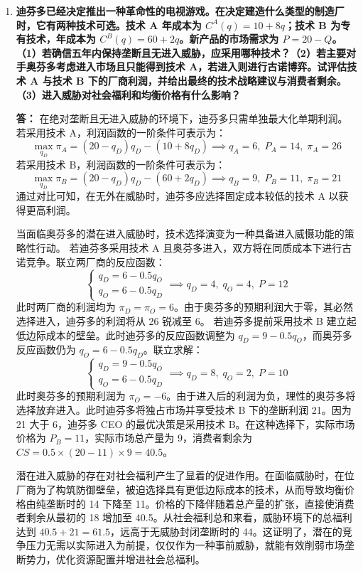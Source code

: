 \begin{enumerate}[label=\textbf{\arabic*.}, leftmargin=*]
		\item \textbf{迪芬多已经决定推出一种革命性的电视游戏。在决定建造什么类型的制造厂时，它有两种技术可选。技术 A 年成本为 $C^A(q) = 10 + 8q$；技术 B 为专有技术，年成本为 $C^B(q) = 60 + 2q$。新产品的市场需求为 $P = 20 - Q$。（1）若确信五年内保持垄断且无进入威胁，应采用哪种技术？（2）若主要对手奥芬多考虑进入市场且只能得到技术 A，若进入则进行古诺博弈。试评估技术 A 与技术 B 下的厂商利润，并给出最终的技术战略建议与消费者剩余。（3）进入威胁对社会福利和均衡价格有什么影响？}
		
		\textbf{答：}
		在绝对垄断且无进入威胁的环境下，迪芬多只需单独最大化单期利润。若采用技术 A，利润函数的一阶条件可表示为：
		\[
		\max_{q_D} \pi_A = (20 - q_D)q_D - (10 + 8q_D) \implies q_A = 6, \; P_A = 14, \; \pi_A = 26
		\]
		若采用技术 B，利润函数的一阶条件可表示为：
		\[
		\max_{q_D} \pi_B = (20 - q_D)q_D - (60 + 2q_D) \implies q_B = 9, \; P_B = 11, \; \pi_B = 21
		\]
		通过对比可知，在无外在威胁时，迪芬多应选择固定成本较低的技术 A 以获得更高利润。
		
		当面临奥芬多的潜在进入威胁时，技术选择演变为一种具备进入威慑功能的策略性行动。
		若迪芬多采用技术 A 且奥芬多进入，双方将在同质成本下进行古诺竞争。联立两厂商的反应函数：
		\[
		\begin{cases}
			q_D = 6 - 0.5q_O \\
			q_O = 6 - 0.5q_D
		\end{cases}
		\implies q_D = 4, \; q_O = 4, \; P = 12
		\]
		此时两厂商的利润均为 $\pi_D = \pi_O = 6$。由于奥芬多的预期利润大于零，其必然选择进入，迪芬多的利润将从 26 锐减至 6。
		若迪芬多提前采用技术 B 建立起低边际成本的壁垒。此时迪芬多的反应函数调整为 $q_D = 9 - 0.5q_O$，而奥芬多反应函数仍为 $q_O = 6 - 0.5q_D$。联立求解：
		\[
		\begin{cases}
			q_D = 9 - 0.5q_O \\
			q_O = 6 - 0.5q_D
		\end{cases}
		\implies q_D = 8, \; q_O = 2, \; P = 10
		\]
		此时奥芬多的预期利润为 $\pi_O = -6$。由于进入后的利润为负，理性的奥芬多将选择放弃进入。此时迪芬多将独占市场并享受技术 B 下的垄断利润 21。因为 21 大于 6，迪芬多 CEO 的最优决策是采用技术 B。在这种选择下，实际市场价格为 $P_B = 11$，实际市场总产量为 9，消费者剩余为 $CS = 0.5 \times (20 - 11) \times 9 = 40.5$。
		
		潜在进入威胁的存在对社会福利产生了显着的促进作用。在面临威胁时，在位厂商为了构筑防御壁垒，被迫选择具有更低边际成本的技术，从而导致均衡价格由纯垄断时的 14 下降至 11。价格的下降伴随着总产量的扩张，直接使消费者剩余从最初的 18 增加至 40.5。从社会福利总和来看，威胁环境下的总福利达到 $40.5 + 21 = 61.5$，远高于无威胁封闭垄断时的 44。这证明了，潜在的竞争压力无需以实际进入为前提，仅仅作为一种事前威胁，就能有效削弱市场垄断势力，优化资源配置并增进社会总福利。
		

\end{enumerate}
